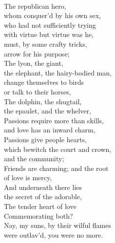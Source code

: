 \documentclass[smalldemyvopaper,11pt,twoside,onecolumn,openright,extrafontsizes]{memoir}
\begin{document}
\\The republican hero,
\\whom conquer'd by his own sex,
\\who had not sufficiently trying
\\with virtue but virtue was he,
\\must, by some crafty tricks,
\\arrow for his purpose;
\\The lyon, the giant,
\\the elephant, the hairy-bodied man,
\\change themselves to birds
\\or talk to their horses,
\\The dolphin, the shugtail,
\\the epaulet, and the whelver,
\\Passions require more than skills,
\\and love has an inward charm,
\\Passions give people hearts,
\\which bewitch the court and crown,
\\and the community;
\\Friends are charming; and the root
\\of love is mercy,
\\And underneath there lies
\\the secret of the adorable,
\\The tender heart of love
\\Commemorating both?
\\Nay, my suns, by their wilful flames
\\were outlav'd, you were no more.
\end{document}
